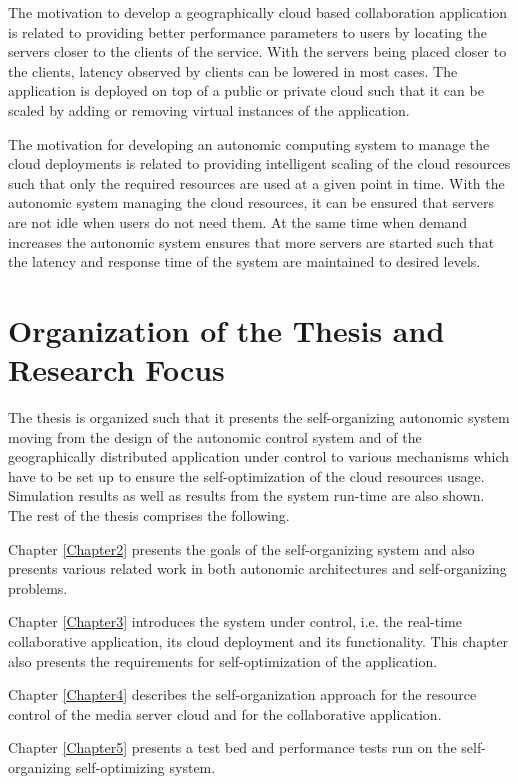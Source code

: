The motivation to develop a geographically cloud based collaboration application is related to providing better performance parameters to users by locating the servers closer to the clients of the service. With the servers being placed closer to the clients, latency observed by clients can be lowered in most cases. The application is deployed on top of a public or private cloud such that it can be scaled by adding or removing virtual instances of the application. 

The motivation for developing an autonomic computing system to manage the cloud deployments is related to providing intelligent scaling of the cloud resources such that only the required resources are used at a given point in time. With the autonomic system managing the cloud resources, it can be ensured that servers are not idle when users do not need them. At the same time when demand increases the autonomic system ensures that more servers are started such that the latency and response time of the system are maintained to desired levels.

\section{Organization of the Thesis and Research Focus}

The thesis is organized such that it presents the self-organizing autonomic system moving from the design of the autonomic control system and of the geographically distributed application under control to various mechanisms which have to be set up to ensure the self-optimization of the cloud resources usage. Simulation results as well as results from the system run-time are also shown. The rest of the thesis  comprises the following.

Chapter \ref{Chapter2} presents the goals of the self-organizing system and also presents various related work in both autonomic architectures and self-organizing problems.

Chapter \ref{Chapter3} introduces the system under control, i.e. the real-time collaborative application, its cloud deployment and its functionality. This chapter also presents the requirements for self-optimization of the application.

Chapter \ref{Chapter4} describes the self-organization approach for the resource control of the media server cloud and for the collaborative application.

Chapter \ref{Chapter5} presents a test bed and performance tests run on the self-organizing self-optimizing system.

